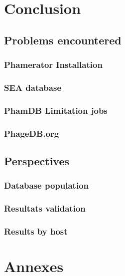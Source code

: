 \documentclass[a4paper,11pt]{report}
\begin{document}
\chapter{Conclusion}

\section{Problems encountered}
\subsection{Phamerator Installation}
\subsection{SEA database}
\subsection{PhamDB Limitation jobs}
\subsection{PhageDB.org}

\section{Perspectives}
\subsection{Database population}
\subsection{Resultats validation}
\subsection{Results by host}

\addtocounter{chapter}{1}


\chapter{Annexes}
\end{document}
